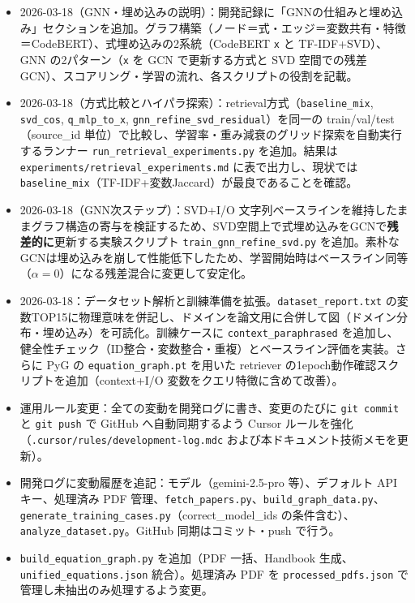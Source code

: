 \documentclass[11pt,a4paper]{jsarticle}
\begin{document}
\begin{itemize}[nosep]
  \item 2026-03-18（GNN・埋め込みの説明）：開発記録に「GNNの仕組みと埋め込み」セクションを追加。グラフ構築（ノード＝式・エッジ＝変数共有・特徴＝CodeBERT）、式埋め込みの2系統（CodeBERT \texttt{x} と TF-IDF+SVD）、GNN の2パターン（\texttt{x} を GCN で更新する方式と SVD 空間での残差 GCN）、スコアリング・学習の流れ、各スクリプトの役割を記載。
  \item 2026-03-18（方式比較とハイパラ探索）：retrieval方式（\texttt{baseline\_mix}, \texttt{svd\_cos}, \texttt{q\_mlp\_to\_x}, \texttt{gnn\_refine\_svd\_residual}）を同一の train/val/test（source\_id 単位）で比較し、学習率・重み減衰のグリッド探索を自動実行するランナー \texttt{run\_retrieval\_experiments.py} を追加。結果は \texttt{experiments/retrieval\_experiments.md} に表で出力し、現状では \texttt{baseline\_mix}（TF-IDF+変数Jaccard）が最良であることを確認。
  \item 2026-03-18（GNN次ステップ）：SVD+I/O 文字列ベースラインを維持したままグラフ構造の寄与を検証するため、SVD空間上で式埋め込みをGCNで\textbf{残差的に}更新する実験スクリプト \texttt{train\_gnn\_refine\_svd.py} を追加。素朴なGCNは埋め込みを崩して性能低下したため、学習開始時はベースライン同等（$\alpha=0$）になる残差混合に変更して安定化。
  \item 2026-03-18：データセット解析と訓練準備を拡張。\texttt{dataset\_report.txt} の変数TOP15に物理意味を併記し、ドメインを論文用に合併して図（ドメイン分布・埋め込み）を可読化。訓練ケースに \texttt{context\_paraphrased} を追加し、健全性チェック（ID整合・変数整合・重複）とベースライン評価を実装。さらに PyG の \texttt{equation\_graph.pt} を用いた retriever の1epoch動作確認スクリプトを追加（context+I/O 変数をクエリ特徴に含めて改善）。
  \item 運用ルール変更：全ての変動を開発ログに書き、変更のたびに \texttt{git commit} と \texttt{git push} で GitHub へ自動同期するよう Cursor ルールを強化（\texttt{.cursor/rules/development-log.mdc} および本ドキュメント技術メモを更新）。
  \item 開発ログに変動履歴を追記：モデル（gemini-2.5-pro 等）、デフォルト API キー、処理済み PDF 管理、\texttt{fetch\_papers.py}、\texttt{build\_graph\_data.py}、\texttt{generate\_training\_cases.py}（correct\_model\_ids の条件含む）、\texttt{analyze\_dataset.py}。GitHub 同期はコミット・push で行う。
  \item \texttt{build\_equation\_graph.py} を追加（PDF 一括、Handbook 生成、\texttt{unified\_equations.json} 統合）。処理済み PDF を \texttt{processed\_pdfs.json} で管理し未抽出のみ処理するよう変更。

\end{itemize}
\end{document}
